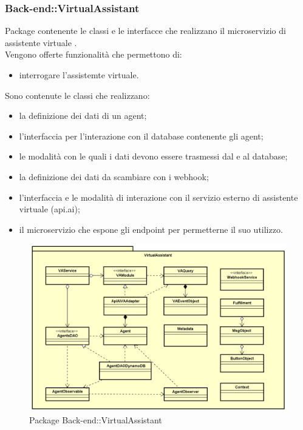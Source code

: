\subsubsection{Back-end::VirtualAssistant}
Package contenente le classi e le interfacce che realizzano il microservizio di assistente virtuale .\\
Vengono offerte funzionalità che permettono di:
\begin{itemize}
\item interrogare l'assistemte virtuale.
\end{itemize}
Sono contenute le classi che realizzano:
 \begin{itemize}
 \item la definizione dei dati di un agent;
 \item l'interfaccia per l'interazione con il database contenente gli agent;
 \item le modalità con le quali i dati devono essere trasmessi dal e al database;
 \item la definizione dei dati da scambiare con i webhook;
 \item l'interfaccia e le modalità di interazione con il servizio esterno di assistente virtuale (api.ai);
 \item il microservizio che espone gli endpoint per permetterne il suo utilizzo.
\end{itemize}
\begin{figure}[h] \centering \includegraphics[width=\textwidth,height=\textheight,keepaspectratio]{images/diagrams/back-end/Official_Backend_0304/VirtualAssistant.png}
	\caption{Package Back-end::VirtualAssistant}
\end{figure}
